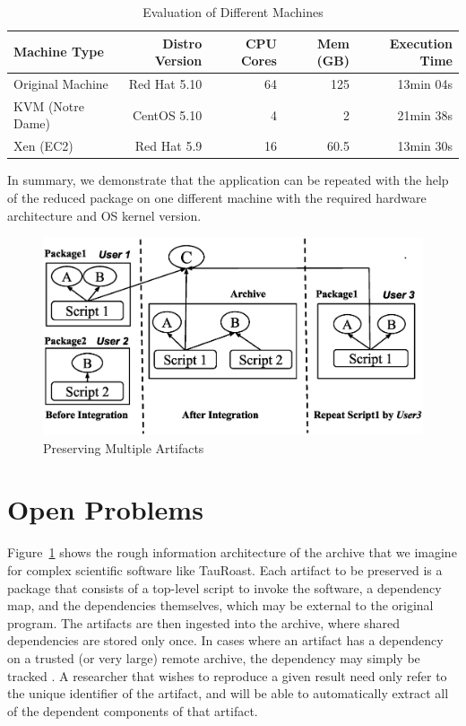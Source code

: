 \documentclass[procedia]{easychair}
\begin{document}
\begin{table}
    \centering
    \begin{tabular}{lrrrr}
    \hline
    \bf Machine Type & \bf Distro Version & \bf CPU Cores & \bf Mem (GB) & \bf Execution Time \\ \hline 
    Original Machine &  Red Hat 5.10 & 64 & 125 & 13min 04s\\  \hline
    KVM (Notre Dame) & CentOS 5.10 & 4 & 2 & 21min 38s\\ \hline
    Xen (EC2) & Red Hat 5.9 & 16 & 60.5 & 13min 30s\\ \hline
    \end{tabular}
    \caption{Evaluation of Different Machines}
    \label{table:config-vm}
\end{table}

In summary, we demonstrate that the application can be repeated with the help of the reduced package on one different machine with the required hardware architecture and OS kernel version.

\begin{figure}
\centering
\includegraphics[width=.6\textwidth]{preservation-integration.eps}
\caption{Preserving Multiple Artifacts}
\label{fig:Preservation integration}
\end{figure}

\section{Open Problems}

Figure~\ref{fig:Preservation integration} shows the rough information
architecture of the archive that we imagine for complex
scientific software like TauRoast.
Each artifact to be preserved is a package that consists of a top-level
script to invoke the software, a dependency map, and the dependencies
themselves, which may be external to the original program.  The artifacts
are then ingested into the archive, where shared dependencies are stored
only once.  In cases where an artifact has a dependency on a trusted
(or very large) remote archive, the dependency may simply be tracked
. A researcher that wishes to reproduce a given
result need only refer to the unique identifier of the artifact, and will
be able to automatically extract all of the dependent components of
that artifact.
\end{document}
